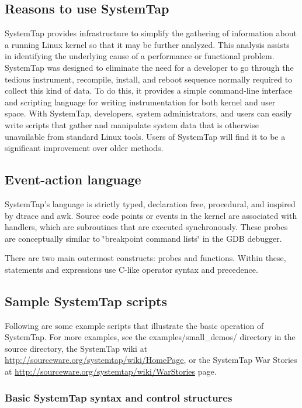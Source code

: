 \documentclass[twoside,english]{article}
\begin{document}
\subsection{Reasons to use SystemTap}

SystemTap provides infrastructure to simplify the gathering of information
about a running Linux kernel so that it may be further analyzed. This analysis
assists in identifying the underlying cause of a performance or functional
problem. SystemTap was designed to eliminate the need for a developer to
go through the tedious instrument, recompile, install, and reboot sequence
normally required to collect this kind of data. To do this, it provides a
simple command-line interface and scripting language for writing
instrumentation for both kernel and user space.
With SystemTap, developers, system administrators, and users can easily write
scripts that gather and manipulate system data that is otherwise unavailable
from standard Linux tools. Users of SystemTap will find it to be a significant
improvement over older methods.

\subsection{Event-action language}
SystemTap's language is strictly typed, declaration free, procedural, and
inspired by dtrace and awk. Source code points or events in the kernel are
associated with handlers, which are subroutines that are executed synchronously.
These probes are conceptually similar to \char`\"{}breakpoint command lists\char`\"{}
in the GDB debugger.

There are two main outermost constructs: probes and functions. Within these,
statements and expressions use C-like operator syntax and precedence.

\subsection{Sample SystemTap scripts}
Following are some example scripts that illustrate the basic operation of
SystemTap. For more examples, see the examples/small\_demos/ directory in
the source directory, the SystemTap wiki at \url{http://sourceware.org/systemtap/wiki/HomePage},
or the SystemTap War Stories at \url{http://sourceware.org/systemtap/wiki/WarStories} page.

\subsubsection{Basic SystemTap syntax and control structures}
\end{document}
